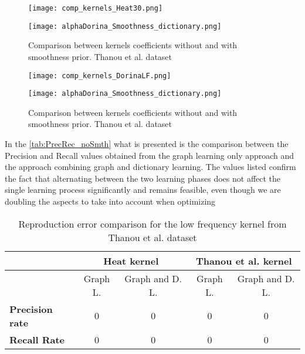 \begin{figure}
  \centering
  \begin{minipage}[c]{.8\textwidth}
    \centering
    \texttt{[image: comp\_kernels\_Heat30.png]}
  \end{minipage}
  \begin{minipage}[c]{.8\textwidth}
    \centering
    \texttt{[image: alphaDorina\_Smoothness\_dictionary.png]}
  \end{minipage}
  \caption{Comparison between kernels coefficients without and with smoothness prior. Thanou et al.   dataset}
  \label{fig:alphaHeatGD}
\end{figure}

\begin{figure}
  \centering
  \begin{minipage}[c]{.8\textwidth}
    \centering
    \texttt{[image: comp\_kernels\_DorinaLF.png]}
  \end{minipage}
  \begin{minipage}[c]{.8\textwidth}
    \centering
    \texttt{[image: alphaDorina\_Smoothness\_dictionary.png]}
  \end{minipage}
  \caption{Comparison between kernels coefficients without and with smoothness prior. Thanou et al.   dataset}
  \label{fig:alphaDorinaGD}
\end{figure}


In the \autoref{tab:PrecRec_noSmth} what is presented is the comparison between the Precision and Recall values obtained from the graph learning only approach and the approach combining graph and dictionary learning. The values listed confirm the fact that alternating between the two learning phases does not affect the single learning process significantly and remains feasible, even though we are doubling the aspects to take into account when optimizing

\begin{table}[htbp]
  \centering
  \begin{tabular}{lcccc}
  &\multicolumn{2}{c}{\textbf{Heat kernel}}&\multicolumn{2}{c}{\textbf{Thanou et al. kernel}}\\
  \toprule
  &Graph L. & Graph and D. L. & Graph L. & Graph and D. L.\\ %
    \midrule
    \textbf{Precision rate} & 0 & 0 & 0 & 0\\
    \textbf{Recall Rate} & 0 & 0 & 0 & 0\\
    \bottomrule
  \end{tabular}
  \caption{Reproduction error comparison for the low frequency kernel from Thanou et al. dataset}
  \label{tab:PrecRec_noSmth}
\end{table}

